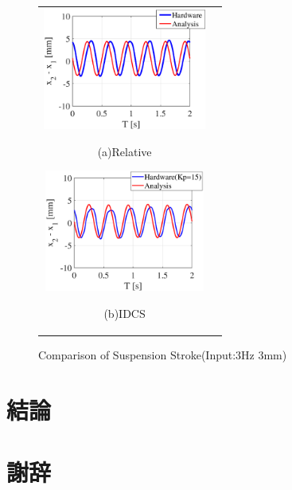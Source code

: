 \documentclass[a4paper,12pt]{article_vdlab_sotsuron}
\begin{document}
\begin{figure}[h]
  \begin{tabular}{cc}
  \begin{minipage}{0.5\hsize}
  \begin{center}
    \includegraphics[height=40mm]{figure/hils_rela_3_3.eps}
    \end{center}
    \begin{center}
    \ (a)Relative\
    \end{center}
  \end{minipage}
  \begin{minipage}{0.5\hsize}
     \begin{center}
      \includegraphics[height=40mm]{figure/hils_idcs_3_3.eps}
      \end{center}
      \begin{center}
      \ (b)IDCS\
    \end{center}
  \end{minipage}
  \end{tabular}
  \vspace*{2mm}
  \caption{Comparison of Suspension Stroke(Input:3Hz 3mm)}
    \label{fig:hils_3_3}
\end{figure}

\newpage
\section{結論}

\newpage
\section*{謝辞}
\end{document}
